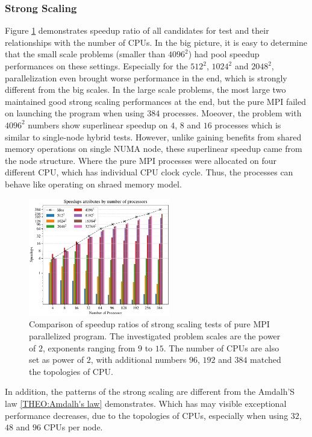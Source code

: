 \subsubsection{Strong Scaling}
Figure \ref{FIG:Benchmark:PURE_MPI_Multi_Node} demonstrates speedup ratio of all candidates for test and their relationships with the number of CPUs.
In the big picture, it is easy to determine that the small scale problems (smaller than $4096^2$) had pool speedup performances on these settings.
Especially for the $512^2$, $1024^2$ and $2048^2$, parallelization even brought worse performance in the end, which is 
strongly different from the big scales.
In the large scale problems, the most large two maintained good strong scaling performances at the end, but 
the pure MPI failed on launching the program when using $384$ processes.
Moeover, the problem with $4096^2$ numbers show superlinear speedup on $4$, $8$ and $16$ processes which 
is similar to single-node hybrid tests.
However, unlike gaining benefits from shared memory operations on single NUMA node, 
these superlinear speedup came from the node structure.
Where the pure MPI processes were allocated on four different CPU, which has individual CPU clock cycle.
Thus, the processes can behave like operating on shraed memory model.
\begin{figure}[htbp]
  \centering
  \includegraphics[width=0.55\textwidth]{figure/FIG_Benchmark_pure_mpi_multi_nodes.pdf}
  \caption{
    Comparison of speedup ratios of strong scaling tests of pure MPI parallelized program. 
    The investigated problem scales are the power of $2$, exponents ranging from $9$ to $15$.
    The number of CPUs are also set as power of $2$, with additional numbers $96$, $192$ and $384$ matched the topologies of CPU.
  }
  \label{FIG:Benchmark:PURE_MPI_Multi_Node}
\end{figure}
In addition, the patterns of the strong scaling are different from the Amdalh'S law \ref{THEO:Amdalh's law} demonstrates.
Which has may visible exceptional performance decreases, due to the topologies of CPUs, especially when using 
$32$, $48$ and $96$ CPUs per node.

